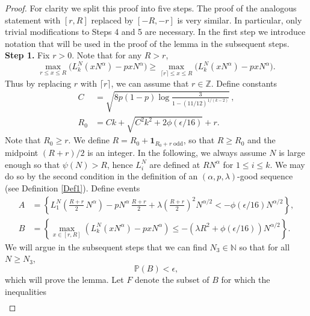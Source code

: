	\begin{proof}
		
		For clarity we split this proof into five steps. The proof of the analogous statement with $[r,R]$ replaced by $[-R,-r]$ is very similar. In particular, only trivial modifications to Steps 4 and 5 are necessary. In the first step we introduce notation that will be used in the proof of the lemma in the subsequent steps.\\
		
		\noindent\textbf{Step 1.} Fix $r>0$. Note that for any $R>r$,
		\[
		\max_{r\leq x\leq R} \big(L_k^N(xN^\alpha) - pxN^\alpha\big) \geq \max_{\lceil r\rceil \leq x \leq R} \big(L_k^N(xN^\alpha) - pxN^\alpha\big).
		\]
		Thus by replacing $r$ with $\lceil r\rceil$, we can assume that $r\in\mathbb{Z}$. Define constants
		\begin{align}
		C &= \sqrt{ 8p(1-p) \log\frac{3}{1-(11/12)^{1/(k-2)}}}\,,\label{21Cdef}\\
		R_0 &= Ck+\sqrt{C^{2}k^{2}+2\phi(\epsilon/16)}+r. \label{21Rdef}
		\end{align}
		Note that $R_0\geq r$. We define $R = R_0 + \mathbf{1}_{R_0 + r\;\mathrm{odd}}$, so that $R\geq R_0$ and the midpoint $(R+r)/2$ is an integer. In the following, we always assume $N$ is large enough so that $\psi(N) > R$, hence $L_i^N$ are defined at $RN^\alpha$ for $1\leq i\leq k$. We may do so by the second condition in the definition of an $(\alpha,p,\lambda)$-good sequence (see Definition \ref{Def1}). Define events
		\begin{equation}\label{21AB}
		\begin{split}
		A &= \left\{L_1^N\left(\frac{R+r}{2}\,N^\alpha\right) - pN^\alpha\,\frac{R+r}{2} + \lambda\left(\frac{R+r}{2}\right)^2 N^{\alpha/2} < -\phi(\epsilon/16)N^{\alpha/2}\right\},\\
		B &= \left\{\max_{x\in[r,R]} \left(L_k^N(xN^\alpha) - pxN^\alpha\right) \leq -(\lambda R^2 + \phi(\epsilon/16)) N^{\alpha/2} \right\}.
		\end{split}
		\end{equation}
		We will argue in the subsequent steps that we can find $N_3\in\mathbb{N}$ so that for all $N\geq N_3$,
		\begin{equation}\label{21Bbound}
		\mathbb{P}(B) < \epsilon,
		\end{equation}
		which will prove the lemma. Let $F$ denote the subset of $B$ for which the inequalities
		\begin{equation}\label{21x1y1}
		\begin{split}

\end{split}
\end{equation}
\end{proof}
